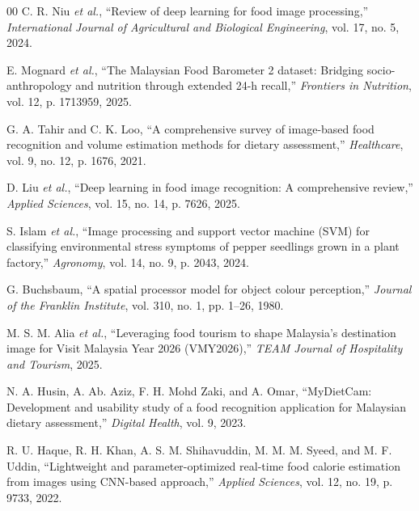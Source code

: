 \documentclass[conference, a4paper]{IEEEtran}
\begin{document}
\begin{thebibliography}{00}
C. R. Niu \emph{et al.}, ``Review of deep learning for food image processing,'' \emph{International Journal of Agricultural and Biological Engineering}, vol. 17, no. 5, 2024.

E. Mognard \emph{et al.}, ``The Malaysian Food Barometer 2 dataset: Bridging socio-anthropology and nutrition through extended 24-h recall,'' \emph{Frontiers in Nutrition}, vol. 12, p. 1713959, 2025.

G. A. Tahir and C. K. Loo, ``A comprehensive survey of image-based food recognition and volume estimation methods for dietary assessment,'' \emph{Healthcare}, vol. 9, no. 12, p. 1676, 2021.

D. Liu \emph{et al.}, ``Deep learning in food image recognition: A comprehensive review,'' \emph{Applied Sciences}, vol. 15, no. 14, p. 7626, 2025.

S. Islam \emph{et al.}, ``Image processing and support vector machine (SVM) for classifying environmental stress symptoms of pepper seedlings grown in a plant factory,'' \emph{Agronomy}, vol. 14, no. 9, p. 2043, 2024.

G. Buchsbaum, ``A spatial processor model for object colour perception,'' \emph{Journal of the Franklin Institute}, vol. 310, no. 1, pp. 1--26, 1980.

M. S. M. Alia \emph{et al.}, ``Leveraging food tourism to shape Malaysia's destination image for Visit Malaysia Year 2026 (VMY2026),'' \emph{TEAM Journal of Hospitality and Tourism}, 2025.

N. A. Husin, A. Ab. Aziz, F. H. Mohd Zaki, and A. Omar, ``MyDietCam: Development and usability study of a food recognition application for Malaysian dietary assessment,'' \emph{Digital Health}, vol. 9, 2023.

R. U. Haque, R. H. Khan, A. S. M. Shihavuddin, M. M. M. Syeed, and M. F. Uddin, ``Lightweight and parameter-optimized real-time food calorie estimation from images using CNN-based approach,'' \emph{Applied Sciences}, vol. 12, no. 19, p. 9733, 2022.

\end{thebibliography}
\end{document}
